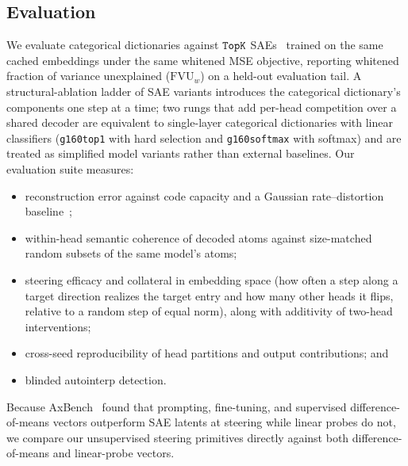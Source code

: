 \subsection{Evaluation}
\label{sec:eval}
We evaluate categorical dictionaries against $\mathop{\mathtt{TopK}}\limits$ SAEs~\cite{gao2024}
trained on the same cached embeddings under the same whitened MSE
objective, reporting whitened fraction of variance unexplained
($\mathrm{FVU}_w$) on a held-out evaluation tail. A structural-ablation
ladder of SAE variants introduces the categorical dictionary's components
one step at a time; two rungs that add per-head competition over a shared
decoder are equivalent to single-layer categorical dictionaries with
linear classifiers
(\texttt{g160top1} with hard selection and \texttt{g160softmax} with
softmax) and are treated as simplified model variants rather than
external baselines. Our evaluation suite measures:
\begin{itemize}
	\item reconstruction error against code capacity and a Gaussian
	rate--distortion baseline~\cite{cover2006};
	\item within-head semantic coherence of decoded atoms against
	size-matched random subsets of the same model's atoms;
	\item steering efficacy and collateral in embedding space (how often
	a step along a target direction realizes the target entry and how
	many other heads it flips, relative to a random step of equal norm),
	along with additivity of two-head interventions;
	\item cross-seed reproducibility of head partitions and output
	contributions; and
	\item blinded autointerp detection.
\end{itemize}
Because AxBench~\cite{wu2025axbenchsteeringllmssimple} found that
prompting, fine-tuning, and supervised difference-of-means vectors
outperform SAE latents at steering while linear probes do not, we compare
our unsupervised steering primitives directly against both
difference-of-means and linear-probe vectors.
